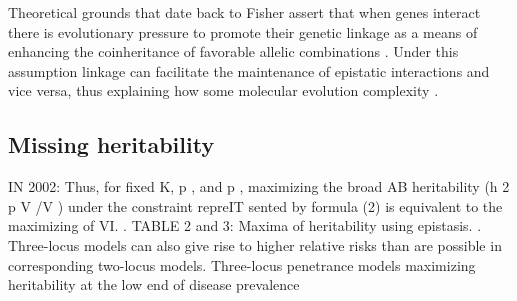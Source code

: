 Theoretical grounds that date back to Fisher assert that when genes interact there is evolutionary pressure to promote their genetic linkage as a means of enhancing the coinheritance of favorable allelic combinations \cite{petkov2005evidence:REF_FISHER}.
Under this assumption linkage can facilitate the maintenance of epistatic interactions and vice versa, thus explaining how some molecular evolution complexity \cite{phillips2008epistasis}.




\subsection{Missing heritability}
IN 2002: Thus, for fixed K, p , and p , maximizing the broad AB heritability (h 2 p V /V ) under the constraint repreIT sented by formula (2) is equivalent to the maximizing of VI. \cite{culverhouse2002perspective}. TABLE 2 and 3: Maxima of heritability using epistasis. \cite{culverhouse2002perspective}. Three-locus models can also give rise to higher relative risks than are possible in corresponding two-locus models. Three-locus penetrance models maximizing heritability at the low end of disease prevalence \cite{culverhouse2002perspective}

